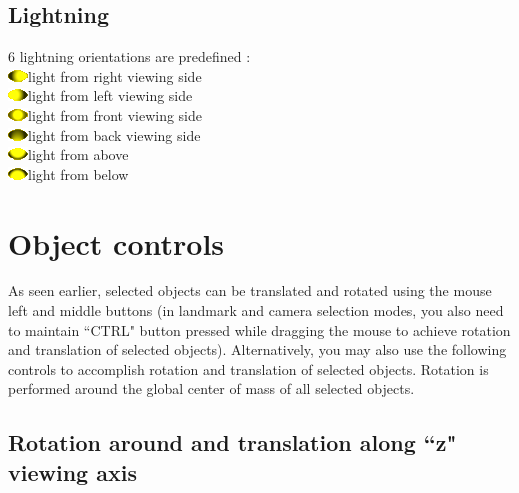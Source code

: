 \subsection{Lightning}
6 lightning orientations are predefined :\\
\includegraphics[scale=0.7]{images/pixmap/s_right_17.png}light from right viewing side\\
\includegraphics[scale=0.7]{images/pixmap/s_left_17.png}light from left viewing side\\
\includegraphics[scale=0.7]{images/pixmap/s_face_17.png}light from front viewing side\\
\includegraphics[scale=0.7]{images/pixmap/s_back_18.png}light from back viewing side\\
\includegraphics[scale=0.7]{images/pixmap/s_dessus_18.png}light from above\\
\includegraphics[scale=0.7]{images/pixmap/s_dessous_18.png}light from below\\

  \section{Object controls}
	As seen earlier, selected objects can be translated and rotated using the mouse left and middle buttons
(in landmark and camera selection modes, you also need to maintain ``CTRL" button pressed
while dragging the mouse to achieve rotation and translation of selected objects). Alternatively, you
may also use the following controls to accomplish rotation and translation of selected objects. Rotation
is performed around the global center of mass of all selected objects.

\subsection{Rotation around and translation along ``z" viewing axis}

